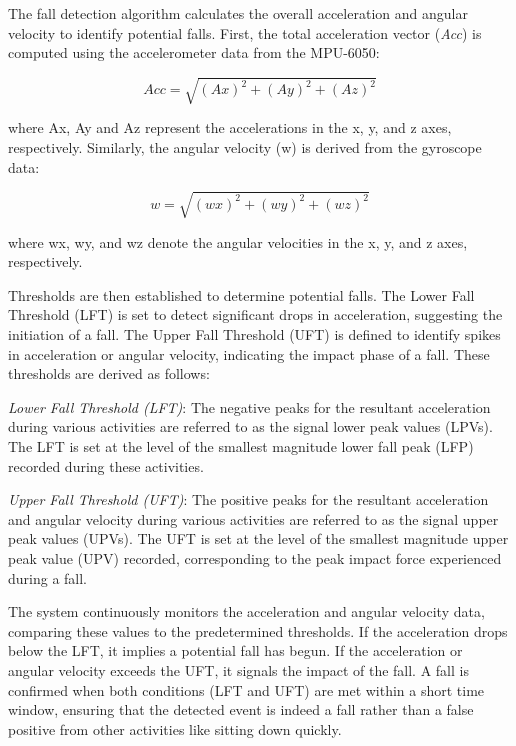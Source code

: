 \documentclass[final,5p,times,twocolumn,authoryear]{elsarticle}
\begin{document}
The fall detection algorithm calculates the overall acceleration and angular velocity to identify potential falls.
First, the total acceleration vector (\textit{Acc}) is computed using the accelerometer data from the MPU-6050:

{\begin{equation}
    Acc=\sqrt{(Ax)^2+(Ay)^2+(Az)^2 }
\end{equation}}

where Ax, Ay and Az represent the accelerations in the x, y, and z axes, respectively.
Similarly, the angular velocity (w) is derived from the gyroscope data:

{
\begin{equation}
    w = \sqrt{(wx)^2+(wy)^2+(wz)^2 }
    \end{equation}
}

where wx, wy, and wz denote the angular velocities in the x, y, and z axes, respectively. 

Thresholds are then established to determine potential falls. The Lower Fall Threshold (LFT) is set to detect significant drops in acceleration, suggesting the initiation of a fall. The Upper Fall Threshold (UFT) is defined to identify spikes in acceleration or angular velocity, indicating the impact phase of a fall. These thresholds are derived as follows: 
\vspace{\baselineskip}

 \textit{Lower Fall Threshold (LFT)}: The negative peaks for the resultant acceleration during various activities are referred to as the signal lower peak values (LPVs). The LFT is set at the level of the smallest magnitude lower fall peak (LFP) recorded during these activities. 

\vspace{\baselineskip}
 \textit{Upper Fall Threshold (UFT)}: The positive peaks for the resultant acceleration and angular velocity during various activities are referred to as the signal upper peak values (UPVs). The UFT is set at the level of the smallest magnitude upper peak value (UPV) recorded, corresponding to the peak impact force experienced during a fall. 

\vspace{\baselineskip}
 The system continuously monitors the acceleration and angular velocity data, comparing these values to the predetermined thresholds. If the acceleration drops below the LFT, it implies a potential fall has begun. If the acceleration or angular velocity exceeds the UFT, it signals the impact of the fall. A fall is confirmed when both conditions (LFT and UFT) are met within a short time window, ensuring that the detected event is indeed a fall rather than a false positive from other activities like sitting down quickly. 
\end{document}
